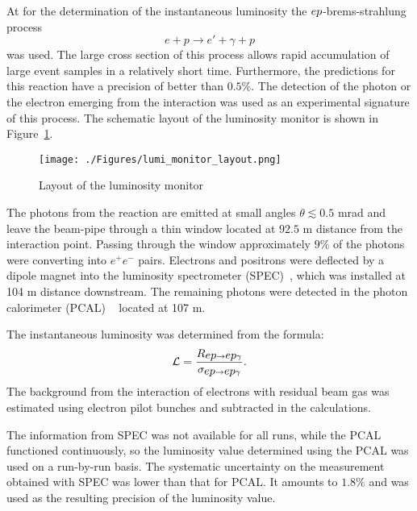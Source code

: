 At \zeus for the determination of the instantaneous luminosity the $\mbox{$e p$}$-brems-strahlung process~\cite{Bethe:1934za}
\begin{equation}
	e + p \rightarrow e' + \gamma + p
\end{equation}
was used. The large cross section of this process allows rapid accumulation of large event samples in a relatively short time. Furthermore, the predictions for this reaction have a precision of better than $0.5\%$. The detection of the photon or the electron emerging from the interaction was used as an experimental signature of this process. The schematic layout of the luminosity monitor is shown in Figure~\ref{fig:lumi_monitor_layout}.
\begin{figure}
	\centering
		\texttt{[image: ./Figures/lumi\_monitor\_layout.png]}
	\caption{Layout of the \zeus luminosity monitor}
	\label{fig:lumi_monitor_layout}
\end{figure}
The photons from the reaction are emitted at small angles $\theta \lesssim 0.5$ mrad and leave the beam-pipe through a thin window located at $92.5$ m distance from the interaction point. Passing through the window approximately $9\%$ of the photons were converting into $e^+e^-$ pairs. Electrons and positrons were deflected by a dipole magnet into the luminosity spectrometer (SPEC)~\cite{physics-0512153}, which was installed at 104 m distance downstream. The remaining photons were detected in the photon calorimeter (PCAL) ~\cite{desy-92-066,zfp:c63:391,acpp:b32:2025} located at 107 m.

The instantaneous luminosity was determined from the formula:
\begin{equation}
\mathcal{L} = \frac{R_{\mbox{$e p$}\rightarrow \mbox{$e p$}\gamma}}{ \sigma_{\mbox{$e p$}\rightarrow \mbox{$e p$}\gamma}}.
\end{equation}
The background from the interaction of electrons with residual beam gas was estimated using electron pilot bunches and subtracted in the calculations.

The information from SPEC was not available for all runs, while the PCAL functioned continuously, so the luminosity value determined using the PCAL was used on a run-by-run basis. The systematic uncertainty on the measurement obtained with SPEC was lower than that for PCAL. It amounts to $1.8\%$ and was used as the resulting precision of the luminosity value.

